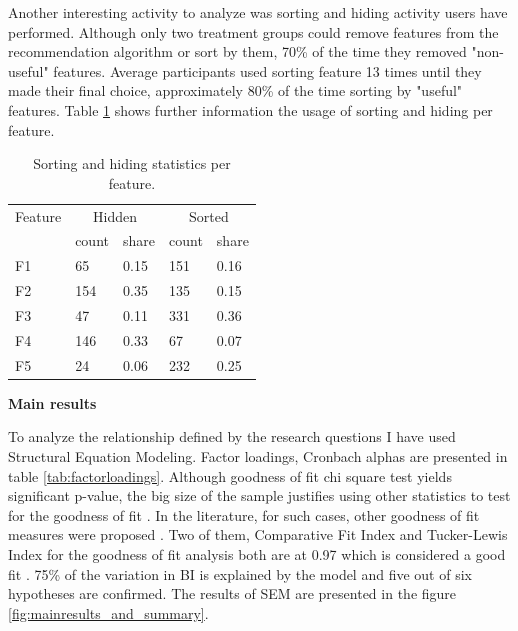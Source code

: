 \documentclass[a4paper,12pt]{article}
\begin{document}
Another interesting activity to analyze was sorting and hiding activity users have performed. Although only two treatment groups could remove features from the recommendation algorithm or sort by them, 70\% of the time they removed "non-useful" features. Average participants used sorting feature 13 times until they made their final choice, approximately 80\% of the time sorting by "useful" features. Table  \ref{tab:eventsperfeature} shows further information the usage of sorting and hiding per feature.

\begin{table}[!ht]
    \centering
    \begin{tabular}{lllll}
    \toprule
        Feature & \multicolumn{2}{c}{Hidden} & \multicolumn{2}{c}{Sorted} \\ \cmidrule(lr){2-3} \cmidrule(lr){4-5}
        & count & share & count & share \\ \midrule
        F1 & 65 & 0.15 & 151 & 0.16 \\
        F2 & 154 & 0.35 & 135 & 0.15 \\
        F3 & 47 & 0.11 & 331 & 0.36 \\
        F4 & 146 & 0.33 & 67 & 0.07 \\
        F5 & 24 & 0.06 & 232 & 0.25 \\ \bottomrule
    \end{tabular}
    \caption{Sorting and hiding statistics per feature.}
    \label{tab:eventsperfeature}
\end{table}

\textbf{Main results}

To analyze the relationship defined by the research questions I have used Structural Equation Modeling. Factor loadings, Cronbach alphas are presented in table \ref{tab:factorloadings}. Although goodness of fit chi square test yields significant p-value, the big size of the sample justifies using other statistics to test for the goodness of fit \citep{schermelleh2003evaluating}. In the literature, for such cases, other goodness of fit measures were proposed \citep{schreiber2006reporting}. Two of them, Comparative Fit Index and Tucker-Lewis Index for the goodness of fit analysis both are at 0.97 which is considered a good fit \citep{schumacker2004beginner}. 75\% of the variation in BI is explained by the model and five out of six hypotheses are confirmed. The results of SEM are presented in the figure \ref{fig:mainresults_and_summary}. 
\end{document}
